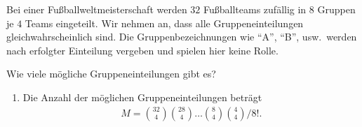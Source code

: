  Bei einer Fußballweltmeisterschaft
werden $32$ Fußballteams zufällig in $8$ Gruppen je $4$ Teams eingeteilt.  Wir
nehmen an, dass alle Gruppeneinteilungen gleichwahrscheinlich sind.  Die
Gruppenbezeichnungen wie "`A"', "`B"', usw.\ werden nach erfolgter Einteilung
vergeben und spielen hier keine Rolle.

        Wie viele mögliche Gruppeneinteilungen gibt es?

\solution
    \begin{enumerate}
        \item Die Anzahl der möglichen Gruppeneinteilungen beträgt
            \begin{align*}
                M = \binom{32}{4} \binom{28}{4} \dots \binom{8}{4} \binom{4}{4} / 8!.
            \end{align*}
    \end{enumerate}

